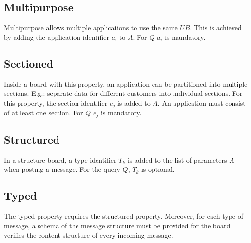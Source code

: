 \documentclass[bibtotoc,halfparskip,oneside]{scrreprt}
\newcommand{\UB}{\ensuremath{\mathit{UB}}\xspace}
\begin{document}
\subsection{Multipurpose}
Multipurpose allows multiple applications to use the same \UB. This is achieved by adding the application identifier $a_i$ to $A$. For $Q$ $a_i$ is mandatory.

\subsection{Sectioned}

Inside a board with this property, an application can be partitioned into multiple sections. E.g.: separate data for different customers into individual sections. For this property, the section identifier $e_j$ is added to $A$. An application must consist of at least one section.
For $Q$ $e_j$ is mandatory.

\subsection{Structured}

In a structure board, a type identifier $T_k$ is added to the list of parameters $A$ when posting a message. For the query $Q$, $T_k$ is optional.


\subsection{Typed}

The typed property requires the structured property. Moreover, for each type of message, a schema of the message structure must be provided for the board verifies the content structure of every incoming message.
\end{document}
